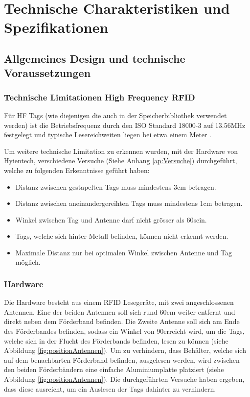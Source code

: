 \chapter{Technische Charakteristiken und Spezifikationen}

\section{Allgemeines Design und technische Voraussetzungen}

\subsection{Technische Limitationen High Frequency RFID}
Für HF Tags (wie diejenigen die auch in der Speicherbibliothek verwendet werden) ist die Betriebsfrequenz durch den ISO Standard 18000-3 auf 13.56MHz festgelegt und typische Lesereichweiten liegen bei etwa einem Meter \parencite{chawla2007}.

Um weitere technische Limitation zu erkennen wurden, mit der Hardware von Hyientech, verschiedene Versuche (Siehe Anhang \ref{ap:Versuche}) durchgeführt, welche zu folgenden Erkenntnisse geführt haben:

\begin{itemize}
	\item Distanz zwischen gestapelten Tags muss mindestens 3cm betragen.
	\item Distanz zwischen aneinandergereihten Tags muss mindestens 1cm betragen.
	\item Winkel zwischen Tag und Antenne darf nicht grösser als 60\SIUnitSymbolDegree sein.
	\item Tags, welche sich hinter Metall befinden, können nicht erkennt werden.
	\item Maximale Distanz nur bei optimalen Winkel zwischen Antenne und Tag möglich.
\end{itemize}

\subsection{Hardware}
Die Hardware besteht aus einem RFID Lesegeräte, mit zwei angeschlossenen Antennen. Eine der beiden Antennen soll sich rund 60cm weiter entfernt und direkt neben dem Förderband befinden. Die Zweite Antenne soll sich am Ende des Förderbandes befinden, sodass ein Winkel von 90\SIUnitSymbolDegree erreicht wird, um die Tags, welche sich in der Flucht des Förderbands befinden, lesen zu können (siehe Abbildung \ref{fig:positionAntennen}). Um zu verhindern, dass Behälter, welche sich auf dem benachbarten Förderband befinden, ausgelesen werden, wird zwischen den beiden Förderbändern eine einfache Aluminiumplatte platziert (siehe Abbildung \ref{fig:positionAntennen}). Die durchgeführten Versuche haben ergeben, dass diese ausreicht, um ein Auslesen der Tags dahinter zu verhindern.

